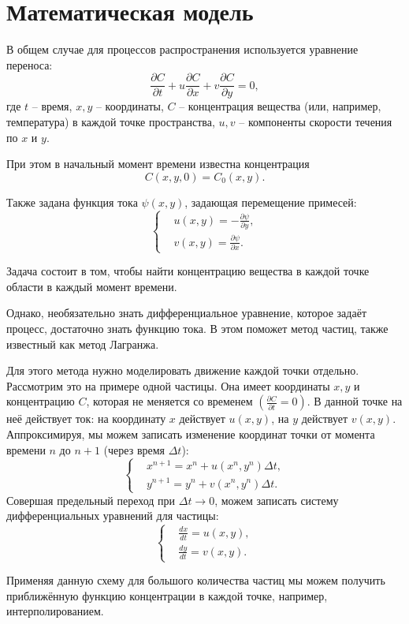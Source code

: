 \section{Математическая модель}
    В общем случае для процессов распространения используется уравнение переноса:
    \[
        \frac{\partial C}{\partial t} + u \frac{\partial C}{\partial x} + v \frac{\partial C}{\partial y} = 0,
    \]
    где \( t \) -- время, \( x, y \) -- координаты, \( C \) -- концентрация вещества (или, например, температура) в каждой точке пространства, \( u, v \) -- компоненты скорости течения по \( x \) и \( y \). 
    
    При этом в начальный момент времени известна концентрация
    \[
        C(x, y, 0) = C_0 (x, y).
    \]
    
    Также задана функция тока \( \psi(x, y) \), задающая перемещение примесей: 
    \[
        \left\{
            \begin{split}
                & u(x, y) = -\frac{\partial \psi}{\partial y}, \\
                & v(x, y) = \frac{\partial \psi}{\partial x}.
            \end{split}
        \right.
    \]

    Задача состоит в том, чтобы найти концентрацию вещества в каждой точке области в каждый момент времени.

    Однако, необязательно знать дифференциальное уравнение, которое задаёт процесс, достаточно знать функцию тока. В этом поможет метод частиц, также известный как метод Лагранжа.

    Для этого метода нужно моделировать движение каждой точки отдельно. Рассмотрим это на примере одной частицы. Она имеет координаты \( x, y \) и концентрацию \( C \), которая не меняется со временем \( \left( \frac{\partial C}{\partial t} = 0 \right) \). В данной точке на неё действует ток: на координату \( x \) действует \( u(x, y) \), на \( y \) действует \( v(x, y) \). Аппроксимируя, мы можем записать изменение координат точки от момента времени \( n \) до \( n+1 \) (через время \( \Delta t \)):
    \[
        \left\{
            \begin{split}
                & x^{n+1} = x^n + u(x^n, y^n) \Delta t, \\
                & y^{n+1} = y^n + v(x^n, y^n) \Delta t.
            \end{split}
        \right.
    \]
    Совершая предельный переход при \( \Delta t \to 0 \), можем записать систему дифференциальных уравнений для частицы:
    \[
        \left\{
            \begin{split}
                & \frac{dx}{dt} = u(x, y), \\
                & \frac{dy}{dt} = v(x, y).
            \end{split}
        \right.
    \]

    Применяя данную схему для большого количества частиц мы можем получить приближённую функцию концентрации в каждой точке, например, интерполированием.